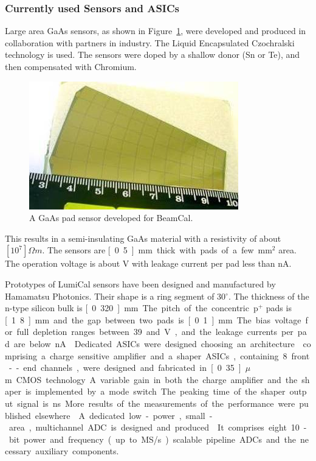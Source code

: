\subsubsection{Currently used Sensors and ASICs}
Large area GaAs sensors, as shown in Figure~\ref{fig:Calorimeter:FCAL:GaAs}, were developed
and produced in collaboration with partners in industry. The Liquid Encapsulated
Czochralski technology is used. The sensors were
doped by a shallow donor (Sn or Te),
and then compensated  with Chromium.
\begin{figure}[hbp]
    \centering
    \includegraphics[width=0.8\columnwidth]{Calorimeter/FCAL/figs/GaAs_sensor_new}
          \caption{A GaAs pad sensor developed for BeamCal.}
    \label{fig:Calorimeter:FCAL:GaAs}
\end{figure}
This results in a semi-insulating GaAs material with a resistivity of about $[10^7]{\Omega m}$.
The sensors are \unit[0.5]{mm} thick with pads of a few mm$^2$ area. The operation voltage is about \unit[100]{V} with
leakage current per pad less than \unit[500]{nA}.

Prototypes of LumiCal sensors have been designed
and manufactured by Hamamatsu
Photonics.
Their shape is a ring segment of 30$^\circ$.
The thickness of the n-type silicon bulk is \unit[0.320]{mm}.
The pitch of the concentric p$^+$ pads is \unit[1.8]{mm} and
the gap between two pads is \unit[0.1]{mm}.
The bias voltage for full depletion ranges between 39 and \unit[45]{V},
and the leakage currents per pad are below \unit[5]{nA}~\cite{eudet2009}.

Dedicated ASICs were designed choosing
an
architecture~\cite{Boie1982365,Gatti:1986qq}
comprising a charge sensitive amplifier and a shaper.
ASICs, containing 8 front--end channels, were designed and fabricated in \unit[0.35]{$\mu$ m} CMOS technology.
A variable gain in both the charge amplifier and
the shaper is implemented by a mode switch. The peaking time of the shaper output signal is \unit[60]{ns}.
More results of the measurements of the performance were published elsewhere~\cite{4600902}.
A dedicated low-power, small-area, multichannel ADC is designed and produced~\cite{6156491}.
It comprises eight 10-bit power and frequency (up to \unit[24]{MS/s}) scalable pipeline ADCs and the necessary
auxiliary components.


